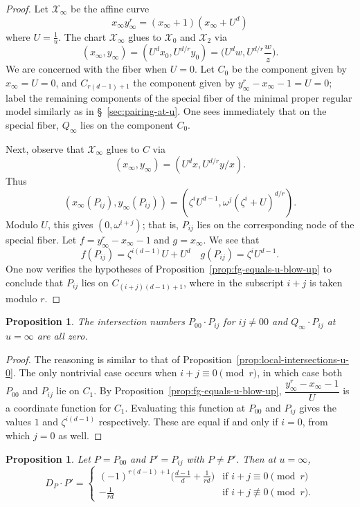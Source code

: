 \documentclass[reqno]{amsart}
\newtheorem{proposition}[thm]{Proposition}
\theoremstyle{definition}
\theoremstyle{remark}
\def\XX{\mathcal{X}}
\newcommand{\sxi}{\mathcal{X}_\infty}
\begin{document}
\begin{proof}
  Let $\sxi$ be the affine curve
  \[
  x_\infty y_\infty^r = (x_\infty + 1)(x_\infty + {U^d})
  \]
  where $U = \frac{1}{u}$. The chart $\sxi$ glues to $\XX_0$ and $\XX_2$ via 
  \[
  (x_\infty, y_\infty) = (U^d x_0, U^{d/r} y_0) = \bigg(U^d w, U^{d/r} \frac{w}{z}\bigg).
  \]
  We are concerned with the fiber when $U = 0$. Let $C_0$ be the component given by $x_\infty = U = 0$, and $C_{r(d-1)+1}$ the component given by $y_\infty^r - x_\infty - 1 = U = 0$; label the remaining components of the special fiber of the minimal proper regular model similarly as in \S~\ref{sec:pairing-at-u}. One sees immediately that on the special fiber, $Q_\infty$ lies on the component $C_0$.

  Next, observe that $\sxi$ glues to $C$ via
  \[
  (x_\infty, y_\infty) = (U^d x, U^{d/r} y/x).
  \]
  Thus
  \[
  (x_\infty(P_{ij}), y_\infty(P_{ij})) = (\zeta^i U^{d-1}, \omega^j (\zeta^i + U)^{d/r}).
  \]
  Modulo $U$, this gives $(0,\omega^{i+j})$; that is, $P_{ij}$ lies on the corresponding node of the special fiber. Let $f = y_\infty^r - x_\infty - 1$ and $g = x_\infty$. We see that 
  \[
  f(P_{ij}) = \zeta^{i(d-1)} U + U^d \quad g(P_{ij}) = \zeta^i U^{d-1}.
  \]
  One now verifies the hypotheses of Proposition~\ref{prop:fg-equals-u-blow-up} to conclude that $P_{ij}$ lies on $C_{(i+j)(d-1) +1}$, where in the subscript $i+j$ is taken modulo $r$.
\end{proof}

\begin{proposition}\label{prop:local-intersections-u-infty}
  The intersection numbers $P_{00} \cdot P_{ij}$ for $ij \neq 00$ and $Q_{\infty} \cdot P_{ij}$ at $u = \infty$ are all zero.
\end{proposition}

\begin{proof}
  The reasoning is similar to that of Proposition~\ref{prop:local-intersections-u-0}. The only nontrivial case occurs when $i+j \equiv 0 \pmod{r}$, in which case both $P_{00}$ and $P_{ij}$ lie on $C_1$. By Proposition~\ref{prop:fg-equals-u-blow-up}, $\dfrac{y_\infty^r - x_\infty - 1}{U}$ is a coordinate function for $C_1$. Evaluating this function at $P_{00}$ and $P_{ij}$ gives the values $1$ and $\zeta^{i(d-1)}$ respectively. These are equal if and only if $i = 0$, from which $j = 0$ as well.
\end{proof}

\begin{proposition}\label{prop:dp-u-infty}
  Let $P = P_{00}$ and $P' = P_{ij}$ with $P \neq P'$. Then at $u = \infty$,
\[
D_P \cdot P' =
\begin{cases}
  (-1)^{r(d-1)+1}\bigg(\frac{d-1}{d} + \frac{1}{rd}\bigg) & \text{if } i+j \equiv 0 \pmod{r} \\
  -\frac{1}{rd} & \text{if } i+j \not\equiv 0 \pmod{r}.
\end{cases}
\]
\end{proposition}
\end{document}
